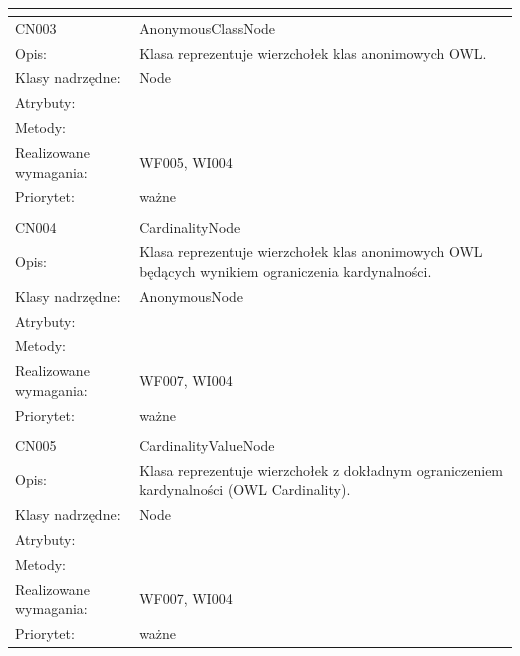 \begin{center}
\begin{longtable}{|m{3cm}|m{9cm}|}
\multicolumn{2}{c}{} \\
 \hline

CN003 & AnonymousClassNode \\ \hline
Opis: & Klasa reprezentuje wierzchołek klas anonimowych OWL.    \\ \hline
Klasy nadrzędne: & Node     \\ \hline
Atrybuty: & %
 \\ \hline
Metody: & %
  \\ \hline
Realizowane wymagania: & WF005, WI004 \\ \hline
Priorytet: & ważne \\ \hline

\multicolumn{2}{c}{} \\
 \hline

CN004 & CardinalityNode \\ \hline
Opis: & Klasa reprezentuje wierzchołek klas anonimowych OWL będących wynikiem ograniczenia kardynalności.    \\ \hline
Klasy nadrzędne: & AnonymousNode     \\ \hline
Atrybuty: & %
 \\ \hline
Metody: & %
  \\ \hline
Realizowane wymagania: & WF007, WI004 \\ \hline
Priorytet: & ważne  \\ \hline

\multicolumn{2}{c}{} \\
 \hline

CN005 & CardinalityValueNode \\ \hline
Opis: & Klasa reprezentuje wierzchołek z dokładnym ograniczeniem kardynalności (OWL Cardinality). \\ \hline
Klasy nadrzędne: & Node     \\ \hline
Atrybuty: & %
 \\ \hline
Metody: & %
  \\ \hline
Realizowane wymagania: & WF007, WI004 \\ \hline
Priorytet: & ważne  \\ \hline


\end{longtable}
\end{center}
